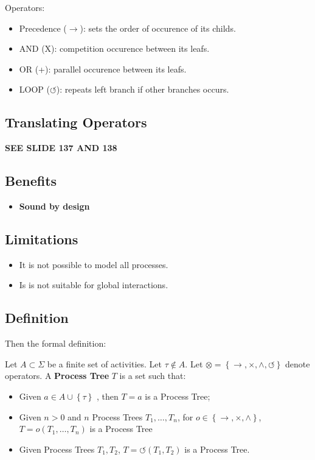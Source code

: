 Operators:
\begin{itemize}
	\item Precedence ($\to $): sets the order of occurence of its childs.
	\item AND (X): competition occurence between its leafs.
	\item OR (+): parallel occurence between its leafs.
	\item LOOP ($\circlearrowleft$):  repeats left branch if other branches occurs.
\end{itemize}

\subsection*{Translating Operators}

\textbf{SEE SLIDE 137 AND 138}

\subsection*{Benefits}

\begin{itemize}
	\item \textbf{Sound by design}
\end{itemize}

\subsection*{Limitations}

\begin{itemize}
	\item It is not possible to model all processes.
	\item Is is not suitable for global interactions.
\end{itemize}

\subsection*{Definition}

Then the formal definition:

\begin{definition}
	Let $A\subset \Sigma$ be a finite set of activities. Let $\tau \not\in A $. Let $\otimes = \left\{ \to ,\times, \wedge, \circlearrowleft \right\} $ denote operators. A \textbf{Process Tree} $T$ is a set such that:
	\begin{itemize}
		\item Given $a\in A\cup \left\{ \tau \right\}$ , then $T=a$ is a Process Tree;
		\item Given $n > 0$ and $n$ Process Trees $T_1,\ldots,T_n$, for $o\in \left\{ \to , \times , \wedge \right\} $, $T=o(T_1,\ldots,T_n)$ is a Process Tree
		\item Given Process Trees $T_1,T_2$, $T=\circlearrowleft(T_1, T_2)$ is a Process Tree.
	\end{itemize}
	
\end{definition}


